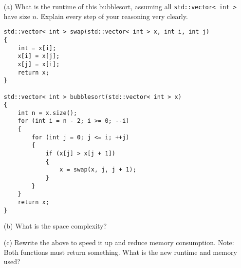 \mbox{}
\begin{enumerate}[nosep]
\item[(a)]
What is the runtime of this bubblesort, assuming all
\verb!std::vector< int >! have size $n$.
Explain every step of your reasoning very clearly.
\begin{Verbatim}[frame=single,fontsize=\small]
std::vector< int > swap(std::vector< int > x, int i, int j)
{
    int = x[i];
    x[i] = x[j];
    x[j] = x[i];
    return x;
}
  
std::vector< int > bubblesort(std::vector< int > x)
{
    int n = x.size();
    for (int i = n - 2; i >= 0; --i)
    {
        for (int j = 0; j <= i; ++j)
        {
            if (x[j] > x[j + 1])
            {
                x = swap(x, j, j + 1);
            }
        }
    }
    return x;
}
\end{Verbatim}
\item[(b)]
What is the space complexity?
\item[(c)]
Rewrite the above to speed it up and reduce memory consumption.
Note: Both functions must return something.
What is the new runtime and memory used?
\end{enumerate}
